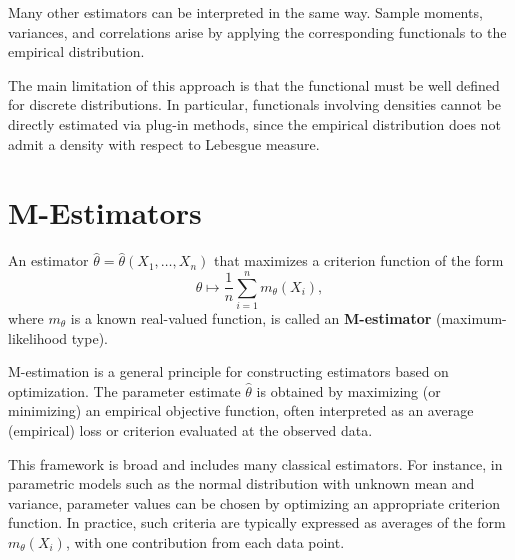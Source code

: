 Many other estimators can be interpreted in the same way. Sample moments,
variances, and correlations arise by applying the corresponding functionals to
the empirical distribution.

The main limitation of this approach is that the functional must be well
defined for discrete distributions. In particular, functionals involving
densities cannot be directly estimated via plug-in methods, since the
empirical distribution does not admit a density with respect to Lebesgue
measure.


\section{M-Estimators}
\label{sec:M-Estimators}

An estimator \(\hat\theta = \hat\theta(X_1, \dots, X_n)\) that maximizes a
criterion function of the form
\[
\theta \mapsto \frac{1}{n} \sum_{i=1}^n m_\theta(X_i),
\]
where \(m_\theta\) is a known real-valued function, is called an
\textbf{M-estimator} (maximum-likelihood type).

M-estimation is a general principle for constructing estimators based on
optimization. The parameter estimate \(\hat\theta\) is obtained by maximizing
(or minimizing) an empirical objective function, often interpreted as an
average (empirical) loss or criterion evaluated at the observed data.

This framework is broad and includes many classical estimators. For instance,
in parametric models such as the normal distribution with unknown mean and
variance, parameter values can be chosen by optimizing an appropriate
criterion function. In practice, such criteria are typically expressed as
averages of the form \(m_\theta(X_i)\), with one contribution from each data
point.


